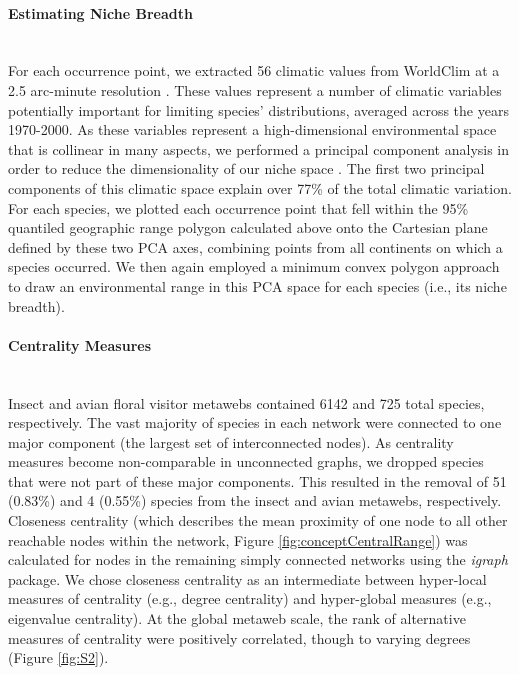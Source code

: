 \paragraph*{Estimating Niche Breadth}\mbox{}\\ 
For each occurrence point, we extracted 56 climatic values from WorldClim at a 2.5 arc-minute resolution \parencite{fick2017worldclim}. These values represent a number of climatic variables potentially important for limiting species' distributions, averaged across the years 1970-2000. As these variables represent a high-dimensional environmental space that is collinear in many aspects, we performed a principal component analysis in order to reduce the dimensionality of our niche space \parencite{kriticos2014extending, dallas2025linking}. The first two principal components of this climatic space explain over 77\% of the total climatic variation. For each species, we plotted each occurrence point that fell within the 95\% quantiled geographic range polygon calculated above onto the Cartesian plane defined by these two PCA axes, combining points from all continents on which a species occurred. We then again employed a minimum convex polygon approach to draw an environmental range in this PCA space for each species (i.e., its niche breadth).

\paragraph*{Centrality Measures}\mbox{}\\ 
Insect and avian floral visitor metawebs contained 6142 and 725 total species, respectively. The vast majority of species in each network were connected to one major component (the largest set of interconnected nodes). As centrality measures become non-comparable in unconnected graphs, we dropped species that were not part of these major components. This resulted in the removal of 51 (0.83\%) and 4 (0.55\%) species from the insect and avian metawebs, respectively. Closeness centrality (which describes the mean proximity of one node to all other reachable nodes within the network, Figure \ref{fig:conceptCentralRange}) was calculated for nodes in the remaining simply connected networks using the \textit{igraph} package. 
We chose closeness centrality as an intermediate between hyper-local measures of centrality (e.g., degree centrality) and hyper-global measures (e.g., eigenvalue centrality). At the global metaweb scale, the rank of alternative measures of centrality were positively correlated, though to varying degrees (Figure \ref{fig:S2}).

